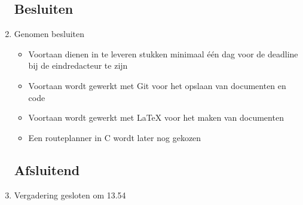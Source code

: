 \documentclass{article}
\begin{document}
\begin{enumerate}
	\subsection*{Besluiten}
	\item Genomen besluiten
	\begin{itemize}
		\item Voortaan dienen in te leveren stukken minimaal één dag voor de deadline bij de eindredacteur te zijn
		\item Voortaan wordt gewerkt met Git voor het opslaan van documenten en code
		\item Voortaan wordt gewerkt met LaTeX voor het maken van documenten
		\item Een routeplanner in C wordt later nog gekozen
	\end{itemize}

	\noindent 
	\subsection*{Afsluitend}
	\item Vergadering gesloten om 13.54

\end{enumerate}
\end{document}
